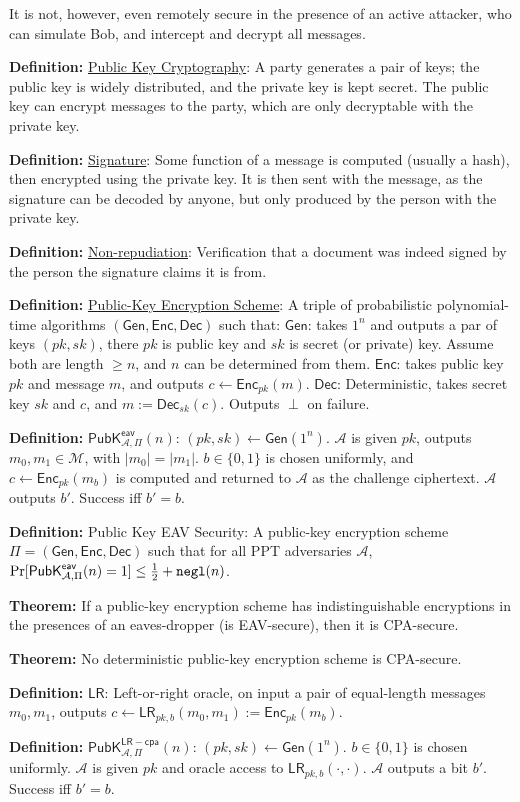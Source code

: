 \documentclass[10pt]{article}
\newcommand{\AAA}{\mathcal{A}}
\newcommand{\MMM}{\mathcal{M}}
\newcommand{\LR}{\mathsf{LR}}
\newcommand{\defn}[1]{{\bf Definition:} \underline{#1}}
\newcommand{\thm}[1]{{\bf Theorem:} \underline{#1}}
\newcommand{\Enc}{\mathsf{Enc}}
\newcommand{\Dec}{\mathsf{Dec}}
\newcommand{\Gen}{\mathsf{Gen}}
\newcommand{\GenEncDec}{(\Gen,\Enc,\Dec)}
\newcommand{\ExptPubEavArgs}[2]{\mathsf{PubK}^{\mathsf{eav}}_{#1,#2}}
\newcommand{\ExptPubCpaArgs}[2]{\mathsf{PubK}^{\mathsf{LR-cpa}}_{#1,#2}}
\newcommand{\ExptPubEav}{\ExptPubEavArgs{\AAA}{\Pi}}
\newcommand{\ExptPubCpa}{\ExptPubCpaArgs{\AAA}{\Pi}}
\newcommand{\negl}{{\tt negl}}
\newcommand{\from}{\leftarrow}
\begin{document}
\begin{multicols}{3}
It is not, however, even remotely secure in the presence of an active attacker, who can simulate Bob, and intercept and decrypt all messages.

\defn{Public Key Cryptography}: A party generates a pair of keys; the public key is widely distributed, and the private key is kept secret. The public key can encrypt messages to the party, which are only decryptable with the private key.

\defn{Signature}: Some function of a message is computed (usually a hash), then encrypted using the private key. It is then sent with the message, as the signature can be decoded by anyone, but only produced by the person with the private key.

\defn{Non-repudiation}: Verification that a document was indeed signed by the person the signature claims it is from.

\defn{Public-Key Encryption Scheme}: A triple of probabilistic polynomial-time algorithms $\GenEncDec$ such that: $\Gen$: takes $1^n$ and outputs a par of keys $(pk,sk)$, there $pk$ is public key and $sk$ is secret (or private) key. Assume both are length $\geq n$, and $n$ can be determined from them. $\Enc$: takes public key $pk$ and message $m$, and outputs $c\from\Enc_{pk}(m)$. $\Dec$: Deterministic, takes secret key $sk$ and $c$, and $m:=\Dec_{sk}(c)$. Outputs $\perp$ on failure.

\defn{$\ExptPubEav(n)$}: $(pk,sk)\from\Gen(1^n)$. $\AAA$ is given $pk$, outputs $m_0,m_1\in\MMM$, with $|m_0|=|m_1|$. $b\in\{0,1\}$ is chosen uniformly, and $c\from\Enc_{pk}(m_b)$ is computed and returned to $\AAA$ as the challenge ciphertext. $\AAA$ outputs $b'$. Success iff $b'=b$.

\defn{} Public Key EAV Security: A public-key encryption scheme $\Pi=\GenEncDec$ such that for all PPT adversaries $\AAA$, $\Pr[\ExptPubEav(n)=1]\leq\frac{1}{2}+\negl(n)$.

\thm{} If a public-key encryption scheme has indistinguishable encryptions in the presences of an eaves-dropper (is EAV-secure), then it is CPA-secure.

\thm{}No deterministic public-key encryption scheme is CPA-secure.

\defn{$\LR$}: Left-or-right oracle, on input a pair of equal-length messages $m_0,m_1$, outputs $c\from\LR_{pk,b}(m_0,m_1):=\Enc_{pk}(m_b)$.

\defn{$\ExptPubCpa(n)$}: $(pk,sk)\from\Gen(1^n)$. $b\in\{0,1\}$ is chosen uniformly. $\AAA$ is given $pk$ and oracle access to $\LR_{pk,b}(\cdot,\cdot)$. $\AAA$ outputs a bit $b'$. Success iff $b'=b$.


\end{multicols}
\end{document}
